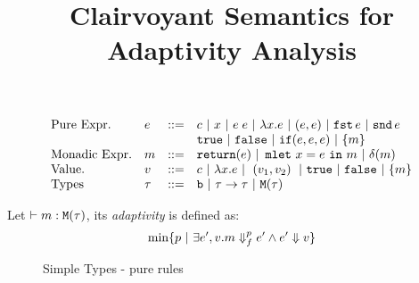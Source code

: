 \documentclass[a4paper,11pt]{article}
\title{Clairvoyant Semantics for Adaptivity Analysis}
\author{}
\date{}
\theoremstyle{definition}
\begin{document}
\maketitle



\[\begin{array}{llll}
    \mbox{Pure Expr.} & e & ::= & c ~|~ x ~|~ e \; e 
                                      ~|~ \lambda x. e  ~|~
                                      ( e,e) ~|~
                                      \mathtt{fst}\, e ~|~ \mathtt{snd}\, e\\ 
                      & & &  \mathtt{true} ~|~ \mathtt{false} ~|~ \mathtt{if} (e, e , e)  ~|~ \{m\} \\
    \mbox{Monadic Expr.} & m & ::= & \mathtt{return}(e) ~|~ \mathop{\mathtt{mlet}}\, x=e\, \mathop{\mathtt{in}}\, m ~|~ \delta(m)\\
    \mbox{Value.} & v & ::= & c ~|~ \lambda x. e ~|~ \mathrel{ ( v_1 , v_2 ) } ~|~  \mathtt{true} ~|~ \mathtt{false}  ~|~ \{m\}\\
    \mbox{Types} & \tau &::=  &  \mathtt{b} ~|~ \tau \to \tau ~|~ \mathtt{M}(\tau)  \\
  \end{array}\]



\begin{definition}
  Let $\vdash m : \mathtt{M}(\tau)$, its \emph{adaptivity} is defined as:
  $$
  \min\{p ~|~ \exists e',v. m\mathrel{\Downarrow_f^{p}} e' \land e' \mathrel{\Downarrow} v \}
  $$
\end{definition}


\begin{figure}[h]
  \caption{Simple Types - pure rules}
  \label{fig:simple-types-pure}
\end{figure}
\end{document}
